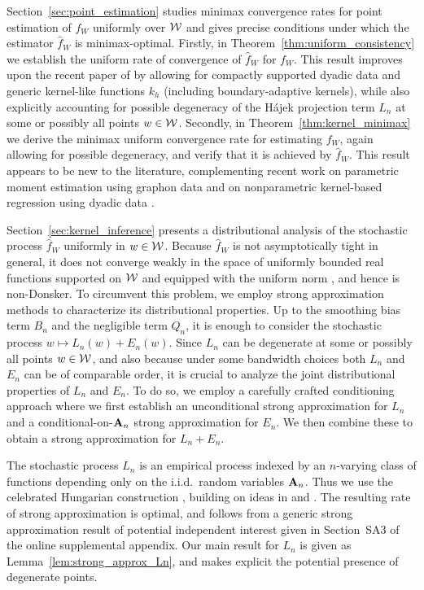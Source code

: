 Section~\ref{sec:point_estimation} studies minimax convergence rates for point
estimation of $f_W$ uniformly over $\mathcal{W}$ and gives precise conditions under
which the estimator $\hat{f}_W$ is minimax-optimal.
Firstly, in Theorem~\ref{thm:uniform_consistency} we establish the uniform rate
of convergence of $\hat{f}_W$ for $f_W$. This result improves upon the
recent paper of \citet{chiang2020empirical} by allowing
for compactly supported dyadic data and
generic kernel-like functions $k_h$ (including boundary-adaptive kernels), while
also explicitly accounting for possible degeneracy of the
H\'{a}jek projection term $L_n$ at some or possibly all points $w\in\mathcal{W}$.
Secondly, in Theorem~\ref{thm:kernel_minimax} we derive the
minimax uniform convergence rate for estimating
$f_W$, again allowing for possible degeneracy,
and verify that it is achieved by $\hat f_W$.
This result appears to be new to the literature,
complementing recent work on parametric moment estimation
using graphon data \citep{gao2021minimax} and on nonparametric
kernel-based regression using dyadic data \citep{graham2021dyadicregression}.

Section~\ref{sec:kernel_inference} presents a distributional analysis of
the stochastic process $\hat{f}_W$ uniformly in $w \in \mathcal{W}$. Because
$\hat{f}_W$ is not asymptotically tight in general, it
does not converge
weakly in the space of uniformly bounded real functions supported on $\mathcal{W}$ and
equipped with the uniform norm \citep{van1996weak},
and hence is non-Donsker.
To circumvent this problem,
we employ strong approximation methods to characterize
its distributional properties.
Up to the smoothing bias term $B_n$ and the negligible term $Q_n$,
it is enough to consider
the stochastic process $w \mapsto L_n(w)+E_n(w)$.
Since $L_n$ can be degenerate at some or possibly all points $w\in\mathcal{W}$, and also
because under some bandwidth choices both $L_n$ and $E_n$ can be of comparable
order, it is crucial to analyze the joint distributional properties of $L_n$ and
$E_n$. To do so, we employ a carefully crafted conditioning approach where we
first establish an unconditional strong approximation for $L_n$ and a
conditional-on-$\mathbf{A}_n$ strong approximation for $E_n$.
We then combine these to obtain a strong approximation for $L_n+E_n$.

The stochastic process $L_n$ is an empirical process indexed by an $n$-varying
class of functions depending only on the i.i.d.\ random variables $\mathbf{A}_n$. Thus
we use the celebrated Hungarian
construction \citep{komlos1975approximation}, building on ideas in
\citet{gine2004kernel} and \citet{gine2010confidence}. The resulting rate of
strong approximation is optimal, and follows from a generic strong approximation
result of potential independent interest given in
Section~SA3 of
the online supplemental appendix.
Our main result for $L_n$ is given as Lemma~\ref{lem:strong_approx_Ln},
and makes explicit the potential presence of degenerate points.

